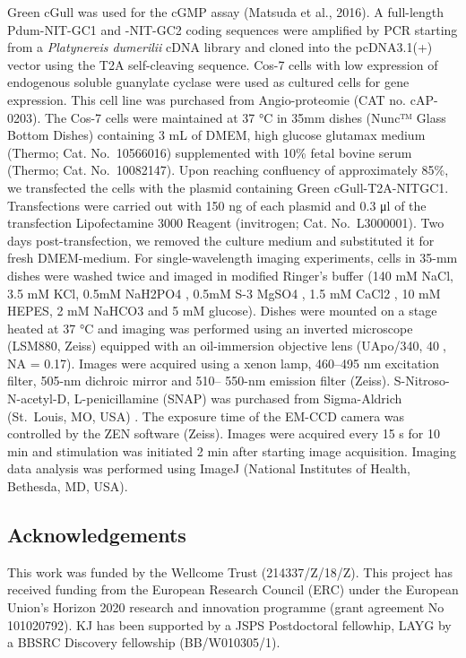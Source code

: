 \documentclass[
  10pt,
  onecolumn]{article}
\begin{document}
Green cGull was used for the cGMP assay (Matsuda et al., 2016). A
full-length Pdum-NIT-GC1 and -NIT-GC2 coding sequences were amplified by
PCR starting from a \emph{Platynereis dumerilii} cDNA library and cloned
into the pcDNA3.1(+) vector using the T2A self-cleaving sequence. Cos-7
cells with low expression of endogenous soluble guanylate cyclase were
used as cultured cells for gene expression. This cell line was purchased
from Angio-proteomie (CAT no. cAP-0203). The Cos-7 cells were maintained
at 37 °C in 35mm dishes (Nunc™ Glass Bottom Dishes) containing 3 mL of
DMEM, high glucose glutamax medium (Thermo; Cat. No.~10566016)
supplemented with 10\% fetal bovine serum (Thermo; Cat. No.~10082147).
Upon reaching confluency of approximately 85\%, we transfected the cells
with the plasmid containing Green cGull-T2A-NITGC1. Transfections were
carried out with 150 ng of each plasmid and 0.3 μl of the transfection
Lipofectamine 3000 Reagent (invitrogen; Cat. No.~L3000001). Two days
post-transfection, we removed the culture medium and substituted it for
fresh DMEM-medium. For single-wavelength imaging experiments, cells in
35-mm dishes were washed twice and imaged in modified Ringer's buffer
(140 mM NaCl, 3.5 mM KCl, 0.5mM NaH2PO4 , 0.5mM S-3 MgSO4 , 1.5 mM CaCl2
, 10 mM HEPES, 2 mM NaHCO3 and 5 mM glucose). Dishes were mounted on a
stage heated at 37 °C and imaging was performed using an inverted
microscope (LSM880, Zeiss) equipped with an oil-immersion objective lens
(UApo/340, 40, NA = 0.17). Images were acquired using a xenon lamp,
460--495 nm excitation filter, 505-nm dichroic mirror and 510-- 550-nm
emission filter (Zeiss). S-Nitroso-N-acetyl-D, L-penicillamine (SNAP)
was purchased from Sigma-Aldrich (St.~Louis, MO, USA) . The exposure
time of the EM-CCD camera was controlled by the ZEN software (Zeiss).
Images were acquired every 15 s for 10 min and stimulation was initiated
2 min after starting image acquisition. Imaging data analysis was
performed using ImageJ (National Institutes of Health, Bethesda, MD,
USA).

\hypertarget{acknowledgements}{%
\subsection{Acknowledgements}\label{acknowledgements}}

This work was funded by the Wellcome Trust (214337/Z/18/Z). This project
has received funding from the European Research Council (ERC) under the
European Union's Horizon 2020 research and innovation programme (grant
agreement No 101020792). KJ has been supported by a JSPS Postdoctoral
fellowhip, LAYG by a BBSRC Discovery fellowship (BB/W010305/1).
\end{document}
